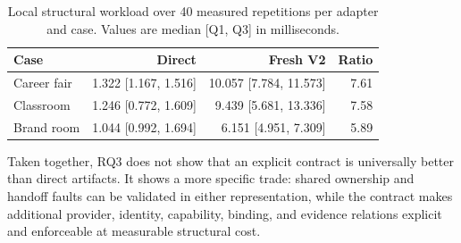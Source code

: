 \begin{table}[t]
  \caption{Local structural workload over 40 measured repetitions per adapter
  and case.  Values are median [Q1, Q3] in milliseconds.}
  \label{tab:runtime-cost}
  \small
  \begin{tabular}{@{}lrrr@{}}
    \toprule
    Case & Direct & Fresh V2 & Ratio \\
    \midrule
    Career fair & 1.322 [1.167, 1.516] & 10.057 [7.784, 11.573] & 7.61 \\
    Classroom & 1.246 [0.772, 1.609] & 9.439 [5.681, 13.336] & 7.58 \\
    Brand room & 1.044 [0.992, 1.694] & 6.151 [4.951, 7.309] & 5.89 \\
    \bottomrule
  \end{tabular}
\end{table}

Taken together, RQ3 does not show that an explicit contract is universally
better than direct artifacts.  It shows a more specific trade: shared
ownership and handoff faults can be validated in either representation, while
the contract makes additional provider, identity, capability, binding, and
evidence relations explicit and enforceable at measurable structural cost.

\FloatBarrier

\FloatBarrier
